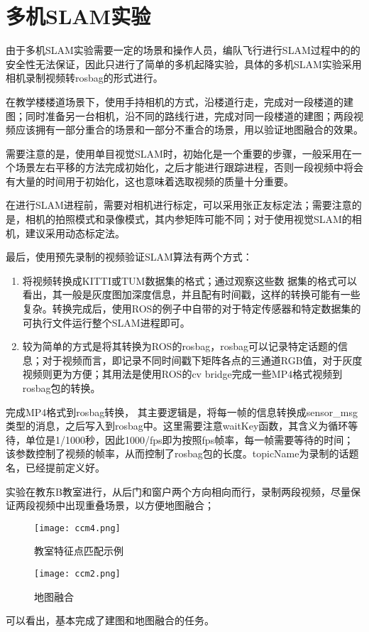 \section{多机SLAM实验}

由于多机SLAM实验需要一定的场景和操作人员，编队飞行进行SLAM过程中的的安全性无法保证，因此只进行了简单的多机起降实验，具体的多机SLAM实验采用相机录制视频转rosbag的形式进行。

在教学楼楼道场景下，使用手持相机的方式，沿楼道行走，完成对一段楼道的建图；同时准备另一台相机，沿不同的路线行进，完成对同一段楼道的建图；两段视频应该拥有一部分重合的场景和一部分不重合的场景，用以验证地图融合的效果。

需要注意的是，使用单目视觉SLAM时，初始化是一个重要的步骤，一般采用在一个场景左右平移的方法完成初始化，之后才能进行跟踪进程，否则一段视频中将会有大量的时间用于初始化，这也意味着选取视频的质量十分重要。

在进行SLAM进程前，需要对相机进行标定，可以采用张正友标定法；需要注意的是，相机的拍照模式和录像模式，其内参矩阵可能不同；对于使用视觉SLAM的相机，建议采用动态标定法。

最后，使用预先录制的视频验证SLAM算法有两个方式：

\begin{enumerate}
	\item 将视频转换成KITTI或TUM数据集的格式；通过观察这些数
	据集的格式可以看出，其一般是灰度图加深度信息，并且配有时间戳，这样的转换可能有一些复杂。转换完成后，使用ROS的例子中自带的对于特定传感器和特定数据集的可执行文件运行整个SLAM进程即可。
	\item 较为简单的方式是将其转换为ROS的rosbag，rosbag可以记录特定话题的信息；对于视频而言，即记录不同时间戳下矩阵各点的三通道RGB值，对于灰度视频则更为方便；其用法是使用ROS的cv bridge完成一些MP4格式视频到rosbag包的转换。
\end{enumerate}

完成MP4格式到rosbag转换，
其主要逻辑是，将每一帧的信息转换成sensor\_msg类型的消息，之后写入到rosbag中。这里需要注意waitKey函数，其含义为循环等待，单位是1/1000秒，因此1000/fps即为按照fps帧率，每一帧需要等待的时间；该参数控制了视频的帧率，从而控制了rosbag包的长度。topicName为录制的话题名，已经提前定义好。

实验在教东B教室进行，从后门和窗户两个方向相向而行，录制两段视频，尽量保证两段视频中出现重叠场景，以方便地图融合；

\begin{figure}[htbp]
	\centering
	\begin{minipage}[t]{0.45\columnwidth} %
		\centering
		\texttt{[image: ccm4.png]}
		\caption{教室特征点匹配示例}
		\label{fig5-1}
	\end{minipage}
	\begin{minipage}[t]{0.45\columnwidth}
		\centering
		\texttt{[image: ccm2.png]}
		\caption{地图融合}
		\label{fig5-2}
	\end{minipage}
\end{figure}

可以看出，基本完成了建图和地图融合的任务。